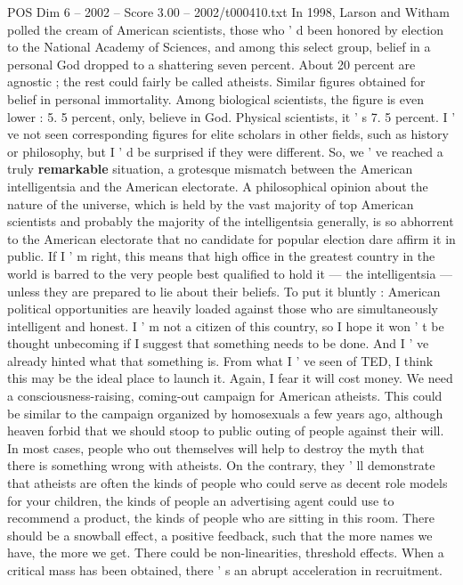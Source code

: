 \begin{textsample}{POS Dim 6 – 2002 – Score 3.00 – 2002/t000410.txt}
In 1998, Larson and Witham polled the cream of American scientists, those who ' d been honored by election to the National Academy of Sciences, and among this select group, belief in a personal God dropped to a shattering seven percent.
About 20 percent are agnostic ; the rest could fairly be called atheists.
Similar figures obtained for belief in personal immortality.
Among biological scientists, the figure is even lower : 5. 5 percent, only, believe in God.
Physical scientists, it ' s 7. 5 percent.
I ' ve not seen corresponding figures for elite scholars in other fields, such as history or philosophy, but I ' d be surprised if they were different.
So, we ' ve reached a truly \textbf{remarkable} situation, a grotesque mismatch between the American intelligentsia and the American electorate.
A philosophical opinion about the nature of the universe, which is held by the vast majority of top American scientists and probably the majority of the intelligentsia generally, is so abhorrent to the American electorate that no candidate for popular election dare affirm it in public.
If I ' m right, this means that high office in the greatest country in the world is barred to the very people best qualified to hold it — the intelligentsia — unless they are prepared to lie about their beliefs.
To put it bluntly : American political opportunities are heavily loaded against those who are simultaneously intelligent and honest.
I ' m not a citizen of this country, so I hope it won ' t be thought unbecoming if I suggest that something needs to be done.
And I ' ve already hinted what that something is.
From what I ' ve seen of TED, I think this may be the ideal place to launch it.
Again, I fear it will cost money.
We need a consciousness-raising, coming-out campaign for American atheists.
This could be similar to the campaign organized by homosexuals a few years ago, although heaven forbid that we should stoop to public outing of people against their will.
In most cases, people who out themselves will help to destroy the myth that there is something wrong with atheists.
On the contrary, they ' ll demonstrate that atheists are often the kinds of people who could serve as decent role models for your children, the kinds of people an advertising agent could use to recommend a product, the kinds of people who are sitting in this room.
There should be a snowball effect, a positive feedback, such that the more names we have, the more we get.
There could be non-linearities, threshold effects.
When a critical mass has been obtained, there ' s an abrupt acceleration in recruitment.

\end{textsample}

